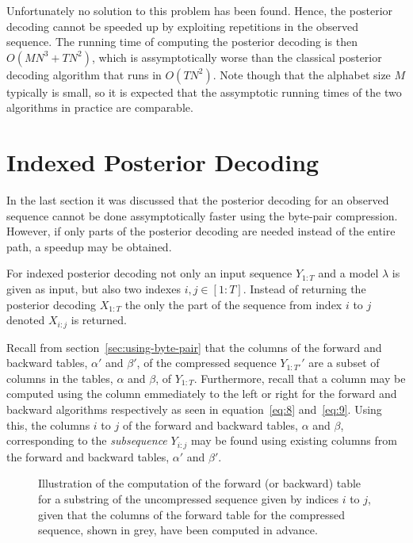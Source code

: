 Unfortunately no solution to this problem has been found. Hence, the posterior
decoding cannot be speeded up by exploiting repetitions in the observed
sequence. The running time of computing the posterior decoding is then
$O\left(M N^3 + TN^2\right)$, which is assymptotically worse than the classical posterior
decoding algorithm that runs in $O\left(TN^2\right)$. Note though that the alphabet size
$M$ typically is small, so it is expected that the assymptotic running times of
the two algorithms in practice are comparable.

\section{Indexed Posterior Decoding}

In the last section it was discussed that the posterior decoding for an
observed sequence cannot be done assymptotically faster using the byte-pair
compression. However, if only parts of the posterior decoding are needed
instead of the entire path, a speedup may be obtained.

For indexed posterior decoding not only an input sequence $Y_{1:T}$ and a model
$\lambda$ is given as input, but also two indexes $i,j \in [1:T]$. Instead of
returning the posterior decoding $X_{1:T}$ the only the part of the sequence
from index $i$ to $j$ denoted $X_{i:j}$ is returned.

Recall from section~\ref{sec:using-byte-pair} that the columns of the forward
and backward tables, $\alpha'$ and $\beta'$, of the compressed sequence
$Y_{1:T'}'$ are a subset of columns in the tables, $\alpha$ and $\beta$, of
$Y_{1:T}$. Furthermore, recall that a column may be computed using the column
emmediately to the left or right for the forward and backward algorithms
respectively as seen in equation~\eqref{eq:8} and~\eqref{eq:9}. Using this, the
columns $i$ to $j$ of the forward and backward tables, $\alpha$ and $\beta$,
corresponding to the \emph{subsequence} $Y_{i:j}$ may be found using existing
columns from the forward and backward tables, $\alpha'$ and $\beta'$.

\begin{figure}
  \centering
  
  \caption{Illustration of the computation of the forward (or backward) table
    for a substring of the uncompressed sequence given by indices $i$ to $j$,
    given that the columns of the forward table for the compressed sequence,
    shown in grey, have been computed in advance.}
  \label{fig:subsequence-posterior}
\end{figure}

